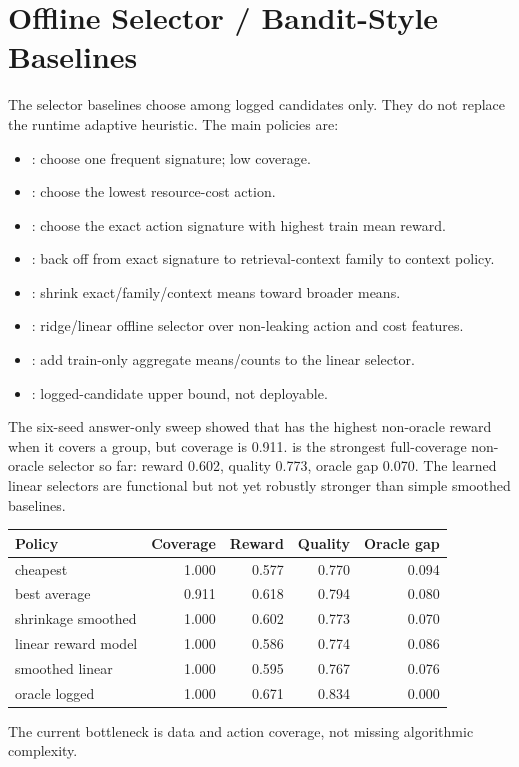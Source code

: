 \section{Offline Selector / Bandit-Style Baselines}

The selector baselines choose among logged candidates only. They do not replace the runtime adaptive heuristic. The main policies are:

\begin{itemize}[leftmargin=*]
  \item {}: choose one frequent signature; low coverage.
  \item {}: choose the lowest resource-cost action.
  \item {}: choose the exact action signature with highest train mean reward.
  \item {}: back off from exact signature to retrieval-context family to context policy.
  \item {}: shrink exact/family/context means toward broader means.
  \item {}: ridge/linear offline selector over non-leaking action and cost features.
  \item {}: add train-only aggregate means/counts to the linear selector.
  \item {}: logged-candidate upper bound, not deployable.
\end{itemize}

The six-seed answer-only sweep showed that  has the highest non-oracle reward when it covers a group, but coverage is 0.911.  is the strongest full-coverage non-oracle selector so far: reward 0.602, quality 0.773, oracle gap 0.070. The learned linear selectors are functional but not yet robustly stronger than simple smoothed baselines.

\begin{center}
\small
\begin{tabular}{>{\raggedright\arraybackslash}p{4.4cm} r r r r}
\toprule
Policy & Coverage & Reward & Quality & Oracle gap \\
\midrule
cheapest & 1.000 & 0.577 & 0.770 & 0.094 \\
best average & 0.911 & 0.618 & 0.794 & 0.080 \\
shrinkage smoothed & 1.000 & 0.602 & 0.773 & 0.070 \\
linear reward model & 1.000 & 0.586 & 0.774 & 0.086 \\
smoothed linear & 1.000 & 0.595 & 0.767 & 0.076 \\
oracle logged & 1.000 & 0.671 & 0.834 & 0.000 \\
\bottomrule
\end{tabular}
\end{center}

The current bottleneck is data and action coverage, not missing algorithmic complexity.
